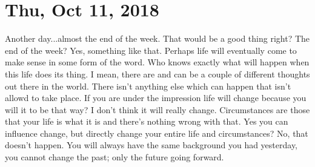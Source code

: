 \section{Thu, Oct 11, 2018}

Another day...almost the end of the week. That would be a good thing right? The end of the week? 
Yes, something like that. Perhaps life will eventually come to make sense in some form of the word.
Who knows exactly what will happen when this life does its thing. I mean, there are and can be 
a couple of different thoughts out there in the world. There isn't anything else which can happen
that isn't allowd to take place. If you are under the impression life will change because you will it
to be that way? I don't think it will really change. Circumstances are those that your life is
what it is and there's nothing wrong with that. Yes you can influence change, but directly change
your entire life and circumstances? No, that doesn't happen. You will always have the same
background you had yesterday, you cannot change the past; only the future going forward.
